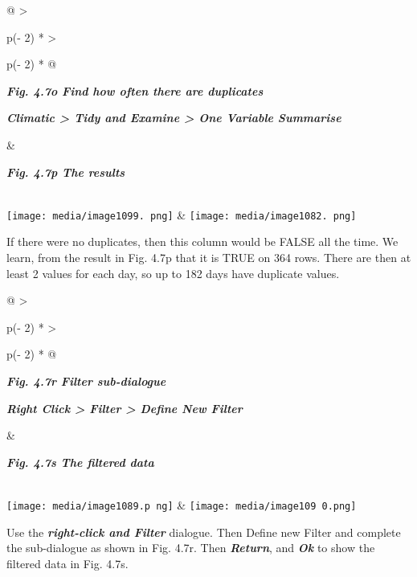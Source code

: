 \documentclass[
  letterpaper,
  DIV=11,
  numbers=noendperiod]{scrreprt}
\begin{document}
\begin{longtable}[]{@{}
  >{\raggedright\arraybackslash}p{(\columnwidth - 2\tabcolsep) * }
  >{\raggedright\arraybackslash}p{(\columnwidth - 2\tabcolsep) * }@{}}
\toprule\noalign{}
\begin{minipage}[b]{\linewidth}\raggedright
\textbf{\emph{Fig. 4.7o Find how often there are duplicates}}

\textbf{\emph{Climatic \textgreater{} Tidy and Examine \textgreater{}
One Variable Summarise}}
\end{minipage} & \begin{minipage}[b]{\linewidth}\raggedright
\textbf{\emph{Fig. 4.7p The results}}
\end{minipage} \\
\midrule\noalign{}
\endhead
\bottomrule\noalign{}
\endlastfoot
\texttt{[image: media/image1099. png]}
&
\texttt{[image: media/image1082. png]} \\
\end{longtable}

If there were no duplicates, then this column would be FALSE all the
time. We learn, from the result in Fig. 4.7p that it is TRUE on 364
rows. There are then at least 2 values for each day, so up to 182 days
have duplicate values.

\begin{longtable}[]{@{}
  >{\raggedright\arraybackslash}p{(\columnwidth - 2\tabcolsep) * }
  >{\raggedright\arraybackslash}p{(\columnwidth - 2\tabcolsep) * }@{}}
\toprule\noalign{}
\begin{minipage}[b]{\linewidth}\raggedright
\textbf{\emph{Fig. 4.7r Filter sub-dialogue}}

\textbf{\emph{Right Click \textgreater{} Filter \textgreater{} Define
New Filter}}
\end{minipage} & \begin{minipage}[b]{\linewidth}\raggedright
\textbf{\emph{Fig. 4.7s The filtered data}}
\end{minipage} \\
\midrule\noalign{}
\endhead
\bottomrule\noalign{}
\endlastfoot
\texttt{[image: media/image1089.p ng]}
&
\texttt{[image: media/image109 0.png]} \\
\end{longtable}

Use the \textbf{\emph{right-click and Filter}} dialogue. Then Define new
Filter and complete the sub-dialogue as shown in Fig. 4.7r. Then
\textbf{\emph{Return}}, and \textbf{\emph{Ok}} to show the filtered data
in Fig. 4.7s.
\end{document}
